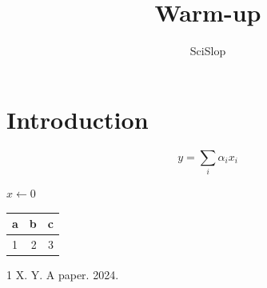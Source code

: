 \documentclass[10pt,twocolumn]{article}
\begin{document}
\title{Warm-up}\author{SciSlop}\maketitle
\section{Introduction}\lipsum[1]
\begin{equation}y = \sum_i \alpha_i x_i\end{equation}
\begin{algorithm}[t]\caption{Warm}\begin{algorithmic}\STATE $x \gets 0$\end{algorithmic}\end{algorithm}
\begin{table}[t]\centering\begin{tabular}{lrr}\toprule a & b & c\\\midrule 1 & 2 & 3\\\bottomrule\end{tabular}\end{table}
\cite{x} \citep{x}

\begin{thebibliography}{1} X. Y. A paper. 2024.\end{thebibliography}
\end{document}
